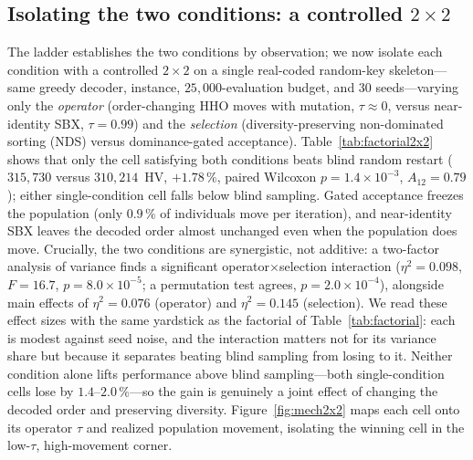 \documentclass[runningheads]{llncs}
\newcommand{\HV}{\textsf{HV}}
\begin{document}
\subsection{Isolating the two conditions: a controlled $2\times2$}
\label{sec:twoconditions}
The ladder establishes the two conditions by observation; we now isolate each condition with a controlled $2\times2$ on a single real-coded random-key skeleton---same greedy decoder, instance, $25{,}000$-evaluation budget, and 30 seeds---varying only the \emph{operator} (order-changing HHO moves with mutation, $\tau\!\approx\!0$, versus near-identity SBX, $\tau\!=\!0.99$) and the \emph{selection} (diversity-preserving non-dominated sorting (NDS) versus dominance-gated acceptance). Table~\ref{tab:factorial2x2} shows that only the cell satisfying both conditions beats blind random restart ($315{,}730$ versus $310{,}214$~\HV, $+1.78\,\%$, paired Wilcoxon $p=1.4\times10^{-3}$, $A_{12}=0.79$); either single-condition cell falls below blind sampling. Gated acceptance freezes the population (only $0.9\,\%$ of individuals move per iteration), and near-identity SBX leaves the decoded order almost unchanged even when the population does move. Crucially, the two conditions are synergistic, not additive: a two-factor analysis of variance finds a significant operator$\times$selection interaction ($\eta^2=0.098$, $F=16.7$, $p=8.0\times10^{-5}$; a permutation test agrees, $p=2.0\times10^{-4}$), alongside main effects of $\eta^2=0.076$ (operator) and $\eta^2=0.145$ (selection). We read these effect sizes with the same yardstick as the factorial of Table~\ref{tab:factorial}: each is modest against seed noise, and the interaction matters not for its variance share but because it separates beating blind sampling from losing to it. Neither condition alone lifts performance above blind sampling---both single-condition cells lose by $1.4$--$2.0\,\%$---so the gain is genuinely a joint effect of changing the decoded order and preserving diversity. Figure~\ref{fig:mech2x2} maps each cell onto its operator $\tau$ and realized population movement, isolating the winning cell in the low-$\tau$, high-movement corner.
\end{document}
